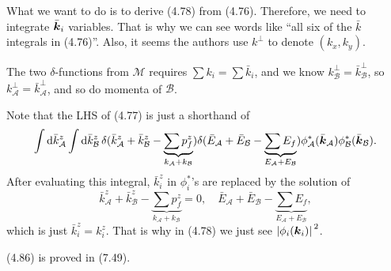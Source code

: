\documentclass[hyperref, a4paper]{article}
\begin{document}
What we want to do is to derive (4.78) from (4.76). Therefore, we need to integrate $\bar{\vb*{k}}_i$
variables. That is why we can see words like ``all six of the $\bar{k}$ integrals in (4.76)''.
Also, it seems the authors use $k^\bot$ to denote $(k_x, k_y)$.

The two $\delta$-functions from $\mathcal{M}$ requires $\sum k_i = \sum \bar{k}_i$, and we know 
$k_\mathcal{B}^\bot = \bar{k}_\mathcal{B}^\bot$, so $k_\mathcal{A}^\bot = \bar{k}_\mathcal{A}^\bot$,
and so do momenta of $\mathcal{B}$. 

Note that the LHS of (4.77) is just a shorthand of 
\[
    \int \dd{\bar{k}^z_\mathcal{A}} \int \dd{\bar{k}^z_\mathcal{B}} 
    \delta(\bar{k}^z_\mathcal{A} + \bar{k}^z_\mathcal{B} - \underbrace{\sum p^z_f}_{k_\mathcal{A} + k_\mathcal{B}}) 
    \delta(\bar{E}_\mathcal{A} + \bar{E}_\mathcal{B} - \underbrace{\sum E_f}_{E_\mathcal{A} + E_\mathcal{B}}) \phi^*_\mathcal{A}(\bar{\vb*{k}}_\mathcal{A}) \phi^*_\mathcal{B}(\bar{\vb*{k}}_\mathcal{B}) .
\]  
After evaluating this integral, $\bar{k}^z_i$ in $\phi_i^*$'s are replaced by the solution of 
\[
    \bar{k}^z_\mathcal{A} + \bar{k}^z_\mathcal{B} - \underbrace{\sum p^z_f}_{k_\mathcal{A} + k_\mathcal{B}} = 0,
    \quad \bar{E}_\mathcal{A} + \bar{E}_\mathcal{B} - \underbrace{\sum E_f}_{E_\mathcal{A} + E_\mathcal{B}},
\]
which is just $\bar{k}^z_i = k^z_i$. That is why in (4.78) we just see $\abs*{\phi_i(\vb*{k}_i)}^2$.

(4.86) is proved in (7.49).
\end{document}
